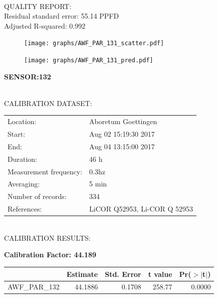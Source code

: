 \documentclass[oneside]{report}
\begin{document}
\hrulefill\\
QUALITY REPORT:\\
Residual standard error: 55.14 PPFD\\
Adjusted R-squared: 0.992



\begin{figure}[H]
  \centering
  \texttt{[image: graphs/AWF\_PAR\_131\_scatter.pdf]}
\end{figure}




\begin{figure}[H]
  \centering
  \texttt{[image: graphs/AWF\_PAR\_131\_pred.pdf]}
\end{figure}

\pagebreak


\begin{center}
\large{\textbf{SENSOR:132}}\\
\end{center}

\hrulefill\\
CALIBRATION DATASET:\\
\begin{table}[h!]
  \centering
  \label{tab:table1}
  \begin{tabular}{ll}
    Location: & Aboretum Goettingen\\ 
    
    
    Start:  & Aug 02 15:19:30 2017 \\
    End:   & Aug 04 13:15:00 2017\\ 
    Duration: & 46 h\\
    Measurement frequency: & 0.3hz\\
    Averaging:  &5 min\\
    Number of records: & 334 \\
    References: & LiCOR Q52953, Li-COR Q 52953 \\
  \end{tabular}
\end{table}

\hrulefill\\
CALIBRATION RESULTS:\\


\begin{center}
\textbf{\large{Calibration Factor: 44.189}}\\
\end{center}
\begin{table}[ht]
\centering
\begin{tabular}{rrrrr}
  \hline
 & Estimate & Std. Error & t value & Pr($>$$|$t$|$) \\ 
  \hline
AWF\_PAR\_132 & 44.1886 & 0.1708 & 258.77 & 0.0000 \\ 
   \hline
\end{tabular}
\end{table}
\end{document}

